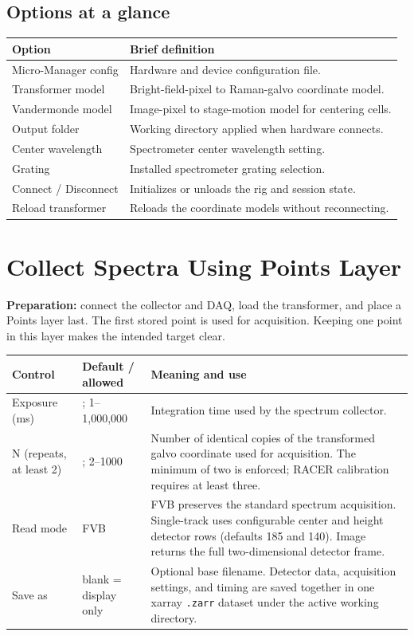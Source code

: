 \documentclass[11pt,oneside]{report}
\makeatletter
\newcommand{\code}[1]{\texttt{#1}}
\newcommand{\fieldtable}{\begin{longtable}{@{}>{\raggedright\arraybackslash}p{0.25\textwidth}>{\raggedright\arraybackslash}p{0.18\textwidth}>{\raggedright\arraybackslash}p{0.50\textwidth}@{}}\toprule\textbf{Control} & \textbf{Default / allowed} & \textbf{Meaning and use}\\\midrule\endhead}
\newcommand{\finishfieldtable}{\bottomrule\end{longtable}}
\makeatother
\begin{document}
\section*{Options at a glance}
\begin{longtable}{@{}p{}p{}@{}}
\toprule\textbf{Option} & \textbf{Brief definition}\\\midrule
Micro-Manager config & Hardware and device configuration file.\\
Transformer model & Bright-field-pixel to Raman-galvo coordinate model.\\
Vandermonde model & Image-pixel to stage-motion model for centering cells.\\
Output folder & Working directory applied when hardware connects.\\
Center wavelength & Spectrometer center wavelength setting.\\
Grating & Installed spectrometer grating selection.\\
Connect / Disconnect & Initializes or unloads the rig and session state.\\
Reload transformer & Reloads the coordinate models without reconnecting.\\
\bottomrule\end{longtable}

\chapter{Collect Spectra Using Points Layer}

\textbf{Preparation:} connect the collector and DAQ, load the transformer, and
place a Points layer last. The first stored point is used for acquisition. Keeping
one point in this layer makes the intended target clear.

\fieldtable
Exposure (ms) & 1000; 1--1,000,000 & Integration time used by the spectrum collector.\\
N (repeats, at least 2) & 3; 2--1000 & Number of identical copies of the transformed
galvo coordinate used for acquisition. The minimum of two is enforced; RACER
calibration requires at least three.\\
Read mode & FVB & FVB preserves the standard spectrum acquisition. Single-track
uses configurable center and height detector rows (defaults 185 and 140). Image
returns the full two-dimensional detector frame.\\
Save as & blank = display only & Optional base filename. Detector data,
acquisition settings, and timing are saved together in one xarray
\code{.zarr} dataset under the active working directory.\\
\finishfieldtable
\end{document}
